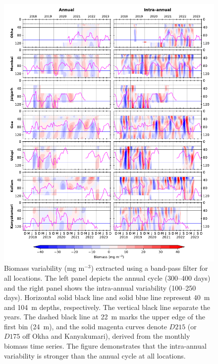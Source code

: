 \documentclass[12pt,a4paper]{article}
\begin{document}
\begin{figure}[htbp]
	\centering
	\includegraphics[width=\textwidth]{./fig_s02_filtered_biomass_annual_intraannual.pdf} 
	\caption{Biomass variability (mg m$^{-3}$) extracted using a band-pass filter for all locations.  The left panel depicts the annual cycle (300--400 days) and the right panel shows the intra-annual variability (100--250 days). Horizontal solid black line and solid blue line represent 40~m and 104~m depths, respectively. The vertical black line separate the years. The dashed black line at 22~m marks the upper edge of the first bin (24~m), and the solid magenta curves denote $D215$ (or $D175$ off Okha and Kanyakumari), derived from the monthly biomass time series. The figure demonstrates that the intra-annual variability is stronger than the annual cycle at all locations.}
	\label{fig:intraannual_annual}
\end{figure}

\end{document}
